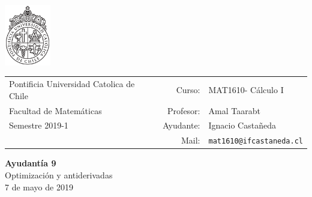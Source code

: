 \documentclass[12pt]{article}
\makeatletter
\newcommand{\ayudantia}{{\sc Ayudantía 9}}
\newcommand{\tituloayu}{Optimización y antiderivadas}
\newcommand{\fecha}{7 de mayo de 2019}
\newcommand{\sigla}{MAT1610}
\newcommand{\nombre}{Cálculo I}
\newcommand{\profesor}{Amal Taarabt}
\newcommand{\ano}{2019}
\newcommand{\semestre}{1}
\newcommand{\mail}{mat1610@ifcastaneda.cl}
\makeatother
\begin{document}
\thispagestyle{empty}

\begin{minipage}{2cm}
	\includegraphics[width=2cm]{../../../../img/logo.pdf}
	\vspace{0.5cm}
\end{minipage}
\begin{minipage}{\linewidth}
	\begin{tabular}{lrl}
		{\scriptsize\sc Pontificia Universidad Catolica de Chile} & \hspace*{0.7in}Curso: &
		\sigla  - \nombre\\
		{\sc Facultad de Matemáticas}&
		Profesor: & \profesor \\
		{\sc Semestre \ano-\semestre} & Ayudante: & {Ignacio Castañeda}\\
		& {Mail:} & \texttt{\mail}
	\end{tabular}
\end{minipage}

\vspace{-10mm}
\begin{center}
	{\LARGE\bf \ayudantia}\\
	\vspace{0.1cm}
	{\tituloayu}\\
	\vspace{0.1cm}
	\fecha\\
	\vspace{0.4cm}
\end{center}
\end{document}
